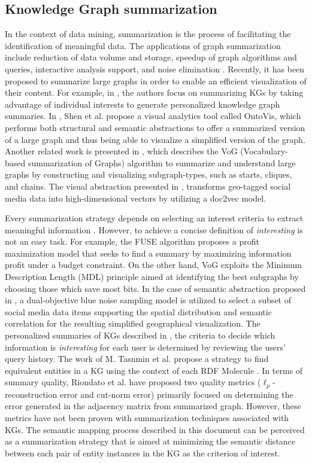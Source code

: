 \documentclass{ieeeaccess}
\begin{document}
\subsection{Knowledge Graph summarization}

In the context of data mining, summarization is the
process of facilitating the identification of 
meaningful data. The applications of graph 
summarization include reduction of data
volume and storage, speedup of graph algorithms and 
queries, interactive analysis support, and noise 
elimination \cite{liu2018graph}. Recently, it
has been proposed to summarize large graphs in order 
to enable an efficient visualization of their content. 
For example, in \cite{Koutra2019}, the authors focus 
on summarizing KGs by taking advantage of individual 
interests to generate personalized knowledge graph
summaries. In \cite{OntoVis}, Shen et al. propose a 
visual analytics tool called OntoVis, which performs 
both structural and semantic abstractions to offer a 
summarized version of a large graph and thus
being able to visualize a simplified version of the 
graph. Another related work is presented in 
\cite{koutra2014vog}, which describes the VoG
(Vocabulary-based summarization of Graphs) algorithm 
to summarize and understand large graphs by 
constructing and visualizing subgraph-types, 
such as starts, cliques, and chains. The visual 
abstraction presented in \cite{8801911}, transforms
geo-tagged social media data into high-dimensional
vectors by utilizing a doc2vec model.

Every summarization strategy 
depends on selecting an interest criteria to extract 
meaningful information \cite{liu2018graph}. However, 
to achieve a concise definition of \textit{interesting} 
is not an easy task. For example, the FUSE algorithm 
\cite {Seah12} proposes a profit maximization
model that seeks to find a summary by maximizing 
information profit under a budget constraint. On the
other hand, VoG \cite{koutra2014vog} exploits
the Minimum Description Length (MDL) principle aimed at 
identifying the best subgraphs by choosing those which 
save most bits. In the case of semantic abstraction
proposed in \cite{8801911}, a dual-objective blue 
noise sampling model is utilized to select a subset of
social media data items supporting the spatial 
distribution and semantic correlation for the resulting
simplified geographical visualization. The personalized 
summaries of KGs described in \cite{Koutra2019}, the 
criteria to decide which information is 
\textit{interesting} for each user is determined by
reviewing the users' query history. The work of M. 
Tasnmin et al. propose a strategy to find equivalent 
entities in a KG using the context of each RDF Molecule
\cite{Tasnim2020}. In terms of summary quality,
Riondato et al. \cite{Riondato2014} have proposed 
two quality metrics ($\ell_{p}$-reconstruction 
error and cut-norm error) primarily focused on 
determining the error generated in the adjacency
matrix from summarized graph. However, these metrics
have not been proven with summarization techniques
associated with KGs. The semantic
mapping process  described in this document can be
perceived as a summarization strategy that is aimed
at minimizing the semantic distance between each 
pair of entity instances in the KG as the criterion of 
interest.
\end{document}
